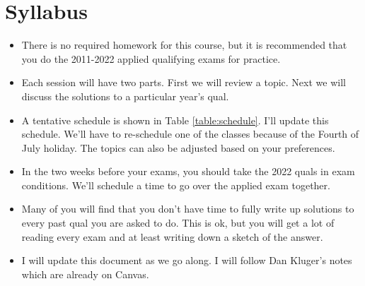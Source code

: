 \section{Syllabus}

\begin{itemize}
	\item There is no required homework for this course, but it is recommended that you do the 2011-2022 applied qualifying exams for practice.
	\item Each session will have two parts. First we will review a topic. Next we will discuss the solutions to a particular year's qual.
	\item A tentative schedule is shown in Table \ref{table:schedule}. I'll update this schedule. We'll have to re-schedule one of the classes because of the Fourth of July holiday. The topics can also be adjusted based on your preferences.
	\item In the two weeks before your exams, you should take the 2022 quals in exam conditions. We'll schedule a time to go over the applied exam together.
	\item Many of you will find that you don't have time to fully write up solutions to every past qual you are asked to do.  This is ok, but you will get a lot of reading every exam and at least writing down a sketch of the answer. 
	\item I will update this document as we go along. I will follow Dan Kluger's notes which are already on Canvas.
\end{itemize}

